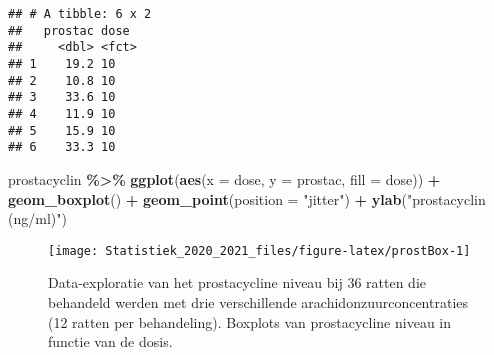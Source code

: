 \documentclass[
  12pt,dutch,coursenotes]{book}
\newenvironment{Shaded}{\begin{snugshade}}{\end{snugshade}}
\newcommand{\CommentTok}[1]{\textcolor[rgb]{0.56,0.35,0.01}{\textit{#1}}}
\newcommand{\DataTypeTok}[1]{\textcolor[rgb]{0.13,0.29,0.53}{#1}}
\newcommand{\KeywordTok}[1]{\textcolor[rgb]{0.13,0.29,0.53}{\textbf{#1}}}
\newcommand{\NormalTok}[1]{#1}
\newcommand{\OperatorTok}[1]{\textcolor[rgb]{0.81,0.36,0.00}{\textbf{#1}}}
\newcommand{\StringTok}[1]{\textcolor[rgb]{0.31,0.60,0.02}{#1}}
\theoremstyle{definition}
\theoremstyle{definition}
\theoremstyle{definition}
\theoremstyle{remark}
\begin{document}
\begin{Shaded}
\end{Shaded}

\begin{verbatim}
## # A tibble: 6 x 2
##   prostac dose 
##     <dbl> <fct>
## 1    19.2 10   
## 2    10.8 10   
## 3    33.6 10   
## 4    11.9 10   
## 5    15.9 10   
## 6    33.3 10
\end{verbatim}

\begin{Shaded}
\begin{Highlighting}[]
\NormalTok{prostacyclin }\OperatorTok{\%\textgreater{}\%}\StringTok{ }\KeywordTok{ggplot}\NormalTok{(}\KeywordTok{aes}\NormalTok{(}\DataTypeTok{x =}\NormalTok{ dose, }\DataTypeTok{y =}\NormalTok{ prostac, }
    \DataTypeTok{fill =}\NormalTok{ dose)) }\OperatorTok{+}\StringTok{ }\KeywordTok{geom\_boxplot}\NormalTok{() }\OperatorTok{+}\StringTok{ }\KeywordTok{geom\_point}\NormalTok{(}\DataTypeTok{position =} \StringTok{"jitter"}\NormalTok{) }\OperatorTok{+}\StringTok{ }
\StringTok{    }\KeywordTok{ylab}\NormalTok{(}\StringTok{"prostacyclin (ng/ml)"}\NormalTok{)}
\end{Highlighting}
\end{Shaded}

\begin{figure}

{\centering \texttt{[image: Statistiek\_2020\_2021\_files/figure-latex/prostBox-1]} 

}

\caption{Data-exploratie van het prostacycline niveau bij 36 ratten die behandeld werden met drie verschillende arachidonzuurconcentraties (12 ratten per behandeling). Boxplots van prostacycline niveau in functie van de dosis.}\label{fig:prostBox}
\end{figure}
\end{document}

